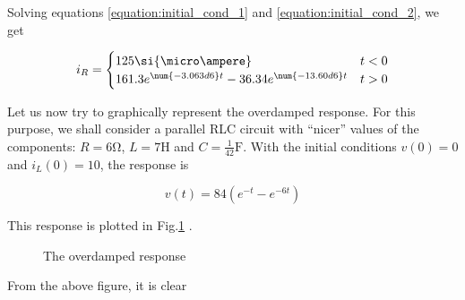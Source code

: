 \documentclass[11pt]{article}
\numberwithin{equation}{section}
\begin{document}
\begin{flushleft}
\begin{tcolorbox}[colback=Magenta!5, colframe=Magenta!75!black, title=\textbf{Example 3.1}, breakable]
Solving equations \ref{equation:initial_cond_1} and \ref{equation:initial_cond_2}, we get 

\begin{equation*}
i_R = \begin{cases} 
          125 \si{\micro\ampere} & t < 0 \\
          161.3e^{\num{-3.063d6}t} - 36.34e^{\num{-13.60d6}t}  & t > 0 
       \end{cases}
\end{equation*}
\end{tcolorbox}

Let us now try to graphically represent the overdamped response. For this purpose, we shall consider a parallel RLC circuit with ``nicer'' values
of the components: $R = 6\si{\ohm}$, $L = 7\si{\henry}$ and $C = \frac{1}{42}\si{\farad}$. With the initial conditions $v(0) = 0$ and $i_L(0)=10$,
the response is 

\begin{equation*}
v(t) = 84(e^{-t} - e^{-6t})
\end{equation*}

This response is plotted in Fig.\ref{fig:overdamped_plot} .

 \begin{tcolorbox}
 \begin{figure}[H]
	\centering
  \caption{The overdamped response}
  \label{fig:overdamped_plot}
\end{figure}%
\end{tcolorbox}

From the above figure, it is clear

\end{flushleft}
\end{document}
